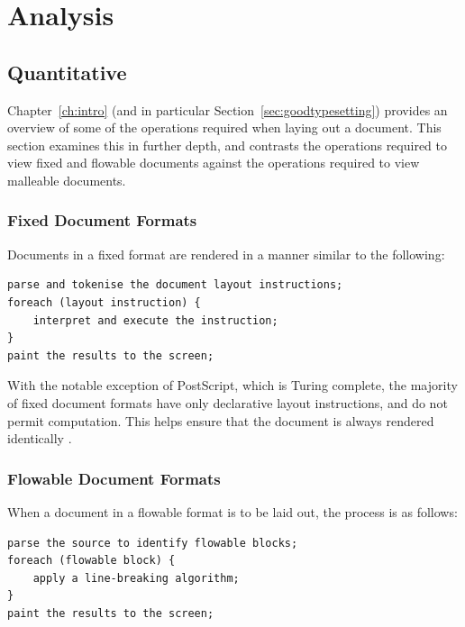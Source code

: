 \chapter{Analysis}\label{ch:analysis}



\section{Quantitative}

Chapter~\ref{ch:intro} (and in particular Section~\ref{sec:goodtypesetting}) provides an overview of some of the operations required when laying out a document. This section examines this in further depth, and contrasts the operations required to view fixed and flowable documents against the operations required to view malleable documents.

\subsection{Fixed Document Formats}
Documents in a fixed format are rendered in a manner similar to the following:
{\singlespacing
\begin{lstlisting}
parse and tokenise the document layout instructions;
foreach (layout instruction) {
    interpret and execute the instruction;
}
paint the results to the screen;
\end{lstlisting}
}
With the notable exception of PostScript, which is Turing complete, the majority of fixed document formats have only declarative layout instructions, and do not permit computation. This helps ensure that the document is always rendered identically \cite{Bagley2007}.

\newpage
\subsection{Flowable Document Formats}

When a document in a flowable format is to be laid out, the process is as follows:
{\singlespacing
\begin{lstlisting}
parse the source to identify flowable blocks;
foreach (flowable block) {
    apply a line-breaking algorithm;
}
paint the results to the screen;
\end{lstlisting}
}

